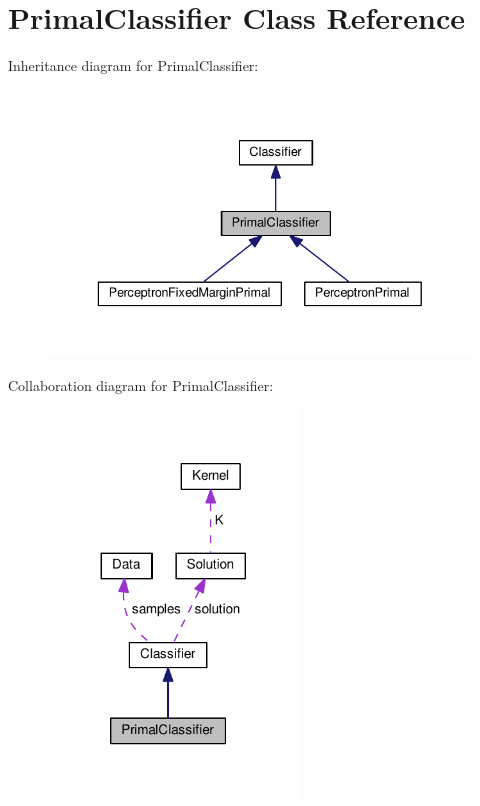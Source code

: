 \hypertarget{class_primal_classifier}{}\section{Primal\+Classifier Class Reference}
\label{class_primal_classifier}


Inheritance diagram for Primal\+Classifier\+:\nopagebreak
\begin{figure}[H]
\begin{center}
\leavevmode
\includegraphics[width=336pt]{class_primal_classifier__inherit__graph}
\end{center}
\end{figure}


Collaboration diagram for Primal\+Classifier\+:\nopagebreak
\begin{figure}[H]
\begin{center}
\leavevmode
\includegraphics[width=188pt]{class_primal_classifier__coll__graph}
\end{center}
\end{figure}
